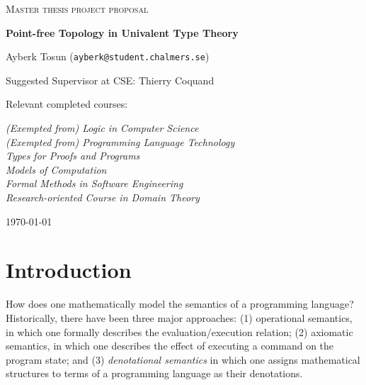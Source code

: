 \documentclass{article}
\begin{document}
\begin{titlepage}

\centering
  
{\scshape\LARGE Master thesis project proposal\\}
  
\vspace{0.5cm}
  
{\huge\bfseries Point-free Topology in Univalent Type Theory\\}
  
\vspace{2cm}
  
{\Large Ayberk Tosun (\texttt{ayberk@student.chalmers.se})\\}
  
\vspace{1.0cm}
  
{\large Suggested Supervisor at CSE: Thierry Coquand\\}
  
\vspace{1.5cm}
  
{\large Relevant completed courses:\par}
  
{\itshape (Exempted from) Logic in Computer Science\\}
{\itshape (Exempted from) Programming Language Technology\\}
{\itshape Types for Proofs and Programs\\}
{\itshape Models of Computation\\}
{\itshape Formal Methods in Software Engineering\\}
{\itshape Research-oriented Course in Domain Theory\\}
  
\vfill

\vfill
  
{\large \today\\} 

\end{titlepage}
\section{Introduction}

How does one mathematically model the semantics of a programming language? Historically,
there have been three major approaches: (1) operational semantics, in which one formally
describes the evaluation/execution relation; (2) axiomatic semantics, in which one
describes the effect of executing a command on the program state; and (3)
\emph{denotational semantics} in which one assigns mathematical structures to terms of a
programming language as their denotations.
\end{document}
